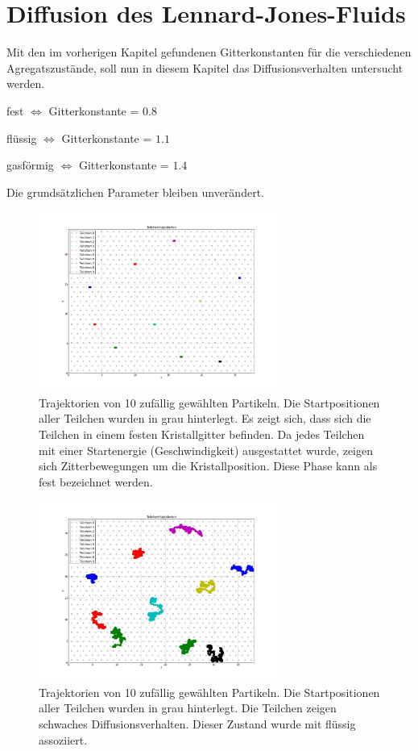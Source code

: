 \chapter{Diffusion des Lennard-Jones-Fluids}
Mit den im vorherigen Kapitel gefundenen Gitterkonstanten für die verschiedenen Agregatszustände, soll nun in diesem Kapitel das Diffusionsverhalten untersucht werden. 
\begin{compactitem}
 \item fest $\Leftrightarrow$ Gitterkonstante = $0.8$
 \item flüssig $\Leftrightarrow$ Gitterkonstante = $1.1$
 \item gasförmig $\Leftrightarrow$ Gitterkonstante = $1.4$
\end{compactitem}
Die grundsätzlichen Parameter bleiben unverändert.
\begin{figure}[h!]
	\centering
		\includegraphics[width=0.70\textwidth]{img/Tra08.jpeg}
	\caption{Trajektorien von 10 zufällig gewählten Partikeln. Die Startpositionen aller Teilchen wurden in grau hinterlegt. Es zeigt sich, dass sich die Teilchen in einem festen Kristallgitter befinden. Da jedes Teilchen mit einer Startenergie (Geschwindigkeit) ausgestattet wurde, zeigen sich Zitterbewegungen um die Kristallposition. Diese Phase kann als fest bezeichnet werden.}
	\label{fig:Tra08}
\end{figure}
\begin{figure}[h!]
	\centering
		\includegraphics[width=0.70\textwidth]{img/Tra11.jpeg}
	\caption{Trajektorien von 10 zufällig gewählten Partikeln. Die Startpositionen aller Teilchen wurden in grau hinterlegt. Die Teilchen zeigen schwaches Diffusionsverhalten. Dieser Zustand wurde mit flüssig assoziiert.}
	\label{fig:Tra11}
\end{figure}
